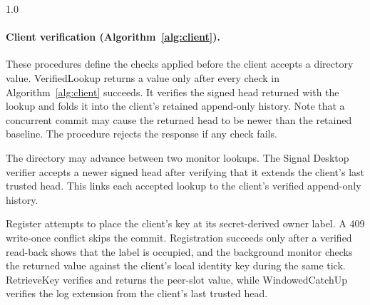 \begin{spacing}{1.0}
\begin{algorithm}[H]
{{  }
}
\end{algorithm}

\paragraph{Client verification (Algorithm~\ref{alg:client}).} These procedures define the checks
applied before the client accepts a directory value.
\textsf{VerifiedLookup} returns a value only after every check in
Algorithm~\ref{alg:client} succeeds. It verifies the signed head returned with the lookup and folds
it into the client's retained append-only history. Note that a concurrent commit may cause the
returned head to be newer than the retained baseline. The procedure rejects the response if any check fails.

The directory may advance between two monitor lookups. The Signal Desktop verifier accepts a newer
signed head after verifying that it extends the client's last trusted head. This links each accepted
lookup to the client's verified append-only history.

\textsf{Register} attempts to place the client's key at its secret-derived owner label. A 409
write-once conflict skips the commit. Registration succeeds only after a verified read-back shows
that the label is occupied, and the background monitor checks the returned value against the
client's local identity key during the same tick. \textsf{RetrieveKey} verifies and returns the
peer-slot value, while \textsf{WindowedCatchUp} verifies the log extension from the client's last
trusted head.


\end{spacing}
